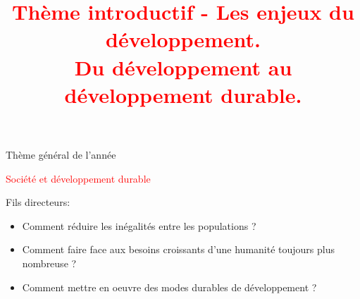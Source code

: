\documentclass{beamer}
\date{}
\title{{\textcolor{red}{Thème introductif - Les enjeux du développement. \\ Du développement au développement durable.}}}
\begin{document}
\newcommand{\df}[2]{\textcolor{red}{\underline{#1}: #2}}

\newcommand{\doc}[1]{
\begin{flushright}
\fbox{Documents : #1}
\end{flushright}
}

\newcommand{\con}[1]{\textcolor{blue}{\underline{Consigne}: #1}}

\newcommand{\rep}[1]{\textcolor{green}{\underline{Réponse}: #1}}

\begin{frame}{Thème général de l'année}
\begin{center}
{\Huge \textcolor{red}{Société et développement durable}}
\end{center}
\end{frame}




\begin{frame}
 \titlepage %
 \end{frame}




\begin{frame}{Fils directeurs: }
\begin{itemize}
\item Comment réduire les inégalités entre les populations ?
\item Comment faire face aux besoins croissants d'une humanité toujours plus nombreuse ?
\item Comment mettre en oeuvre des modes durables de développement ?
\end{itemize}
\end{frame}


  
\end{document}
